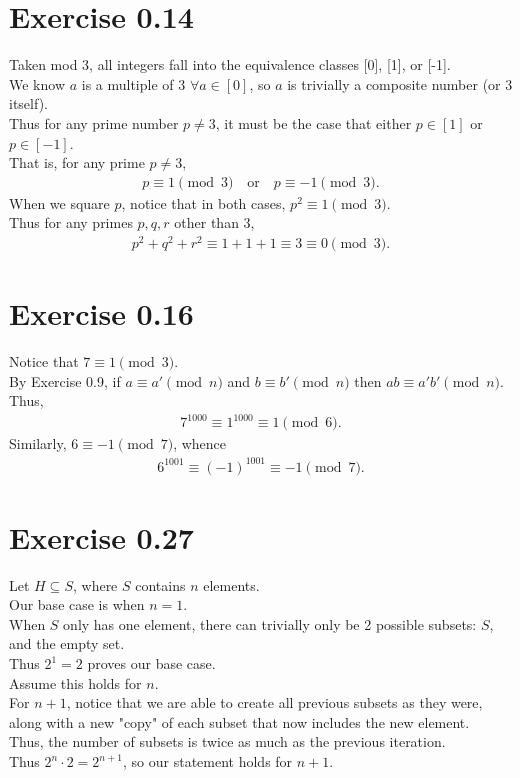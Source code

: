 \documentclass{article}
\begin{document}
\section*{Exercise 0.14}
Taken mod 3, all integers fall into the equivalence classes [0], [1], or [-1]. \\
We know \(a\) is a multiple of 3 \(\forall a\in[0]\), so \(a\) is trivially a composite number (or 3 itself). \\
Thus for any prime number \(p\neq 3\), it must be the case that either \(p\in[1]\) or \(p\in[-1]\). \\
That is, for any prime \(p\neq 3\), \begin{align}
    p \equiv 1\pmod{3} \quad \text{or}\quad p \equiv -1\pmod{3}.
\end{align}
When we square \(p\), notice that in both cases, \(p^2 \equiv 1\pmod{3}\). \\
Thus for any primes \(p, q, r\) other than 3,
\begin{align}
    p^2+q^2+r^2 \equiv 1+1+1 \equiv 3 \equiv 0 \pmod{3}.
\end{align}

\section*{Exercise 0.16}
Notice that \(7\equiv 1\pmod 3\). \\
By Exercise 0.9, if \(a\equiv a'\pmod n\) and \(b\equiv b'\pmod n\) then \(ab\equiv a'b' \pmod n\). \\
Thus, \begin{align}
    7^{1000}\equiv 1^{1000} \equiv 1 \pmod 6.
\end{align}
Similarly, \(6 \equiv -1 \pmod 7 \), whence \begin{align}
    6^{1001} \equiv (-1)^{1001} \equiv -1 \pmod 7.
\end{align}

\section*{Exercise 0.27}
Let \(H\subseteq S\), where \(S\) contains \(n\) elements. \\
Our base case is when \(n=1\). \\
When \(S\) only has one element, there can trivially only be 2 possible subsets: \(S\), and the empty set. \\
Thus \(2^1=2\) proves our base case. \\
Assume this holds for \(n\). \\
For \(n+1\), notice that we are able to create all previous subsets as they were, along with a new "copy" of each subset that now includes the new element. \\
Thus, the number of subsets is twice as much as the previous iteration. \\
Thus \(2^n\cdot 2=2^{n+1}\), so our statement holds for \(n+1\).
\end{document}

